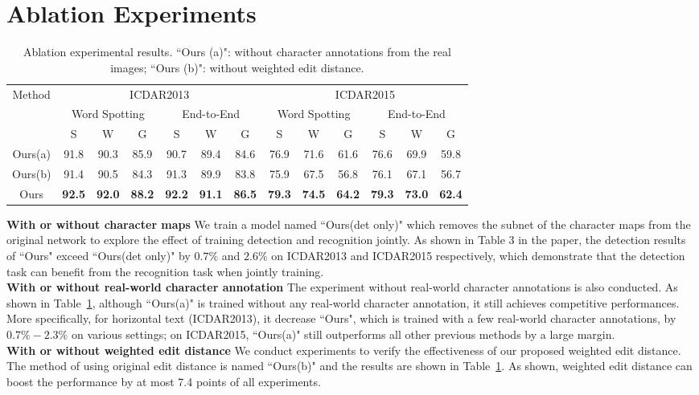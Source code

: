 \documentclass[runningheads]{llncs}
\begin{document}
\section{Ablation Experiments}
%
\begin{table}
\begin{centering}
\caption{Ablation experimental results. ``Ours (a)":  without character annotations from the real images; ``Ours (b)": without weighted edit distance.}
\label{tab_discussion}
\begin{tabular}{|c|c|c|c|c|c|c|c|c|c|c|c|c|}
\hline 
\multirow{3}{*}{Method} & \multicolumn{6}{c|}{ICDAR2013} & \multicolumn{6}{c|}{ICDAR2015}\tabularnewline
\cline{2-13} 
 & \multicolumn{3}{c|}{Word Spotting} & \multicolumn{3}{c|}{End-to-End} & \multicolumn{3}{c|}{Word Spotting} & \multicolumn{3}{c|}{End-to-End}\tabularnewline
\cline{2-13} 
 & S & W & G & S & W & G & S & W & G & S & W & G\tabularnewline
\hline 
Ours(a) &91.8 &90.3 &85.9 &90.7 &89.4 &84.6 &76.9 &71.6 &61.6 &76.6 &69.9 &59.8 \tabularnewline
\hline 
Ours(b) &91.4  &90.5  &84.3  &91.3  &89.9  &83.8  &75.9  &67.5  &56.8  &76.1  &67.1  &56.7 \tabularnewline
\hline 
Ours &\textbf{92.5}  &\textbf{92.0}  &\textbf{88.2} &\textbf{92.2}  &\textbf{91.1}  &\textbf{86.5}  &\textbf{79.3}  &\textbf{74.5}  &\textbf{64.2}  &\textbf{79.3}  &\textbf{73.0}  &\textbf{62.4} \tabularnewline
\hline 
\end{tabular}
\par\end{centering}
\end{table}

\noindent\textbf{With or without character maps} We train a model named ``Ours(det only)" which removes the subnet of the character maps from the original network to explore the effect of training detection and recognition jointly. As shown in Table 3 in the paper, the detection results of ``Ours" exceed ``Ours(det only)" by $0.7\%$ and $2.6\%$ on ICDAR2013 and ICDAR2015 respectively,  which demonstrate that the detection task can  benefit from the recognition task when jointly training.
\\
\textbf{With or without real-world character annotation} The experiment without real-world character annotations is also conducted. As shown in Table~\ref{tab_discussion},  although ``Ours(a)" is trained without any real-world character annotation, it still achieves competitive performances. More specifically, for horizontal text (ICDAR2013), it decrease ``Ours", which is trained with a few real-world character annotations, by  $0.7\%-2.3\%$ on various settings; on ICDAR2015, ``Ours(a)" still outperforms all other previous methods by a large margin.
\\
\textbf{With or without weighted edit distance} We conduct experiments to verify the effectiveness of our proposed weighted edit distance. The method of using original edit distance is named ``Ours(b)" and the results are shown in Table~\ref{tab_discussion}. As shown, weighted edit distance can boost the performance by at most 7.4 points of all experiments. %
\end{document}
